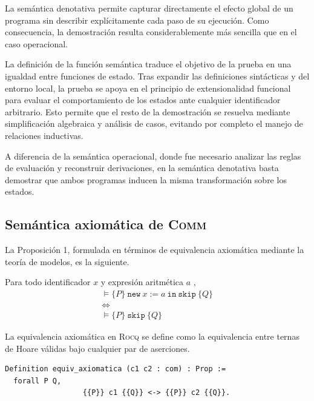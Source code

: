 La semántica denotativa permite capturar directamente el efecto global de un programa sin describir explícitamente cada paso de su ejecución. Como consecuencia, la demostración resulta considerablemente más sencilla que en el caso operacional.

La definición de la función semántica traduce el objetivo de la prueba en una igualdad entre funciones de estado. Tras expandir las definiciones sintácticas y del entorno local, la prueba se apoya en el principio de extensionalidad funcional para evaluar el comportamiento de los estados ante cualquier identificador arbitrario. Esto permite que el resto de la demostración se resuelva mediante simplificación algebraica y análisis de casos, evitando por completo el manejo de relaciones inductivas.

A diferencia de la semántica operacional, donde fue necesario analizar las reglas de evaluación y reconstruir derivaciones, en la semántica denotativa basta demostrar que ambos programas inducen la misma transformación sobre los estados.


\subsection{Semántica axiomática de \textsc{Comm}}

La Proposición 1, formulada en términos de equivalencia axiomática mediante la teoría de modelos, es la siguiente.

\begin{lema}
Para todo identificador $x$ y expresión aritmética $a$ , 
\[
\begin{gathered}
\vDash \{P\}\ \mathtt{new }\ x := a\ \mathtt{in}\ \mathtt{skip}\ \{Q\}\\
\Longleftrightarrow \\
\vDash \{P\}\ \mathtt{skip}\ \{Q\} 
\end{gathered}
\]
\end{lema}

La equivalencia axiomática en \textsc{Rocq} se define como la equivalencia entre ternas de Hoare válidas bajo cualquier par de aserciones.

\begin{lstlisting}[caption={Definición de equivalencia axiomática en Rocq}, basicstyle=\footnotesize \rmfamily
]
Definition equiv_axiomatica (c1 c2 : com) : Prop :=
  forall P Q,
                  {{P}} c1 {{Q}} <-> {{P}} c2 {{Q}}.
\end{lstlisting}


